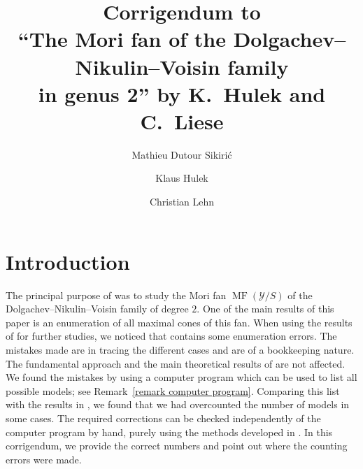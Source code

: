 \documentclass[11pt]{amsart}
\title{Corrigendum to \\
  ``The Mori fan of the Dolgachev--Nikulin--Voisin family\\
  in genus 2'' by K.~Hulek and C.~Liese}
\author{Mathieu Dutour Sikiri\'c}
\author{Klaus Hulek}
\author{Christian Lehn}
\numberwithin{equation}{section}
\theoremstyle{plain}
\theoremstyle{remark}
\newcommand {\Morifan}{\operatorname{MF}}
\newcommand{\sY}{{\mathcal Y}}
\begin{document}


\maketitle


\begin{prelims}

\DisplayAbstractInEnglish

\bigskip

\DisplayKeyWords

\medskip

\DisplayMSCclass


\end{prelims}



\newpage

\setcounter{tocdepth}{1}

\tableofcontents




\section{Introduction}\label{section intro}

The principal purpose of \cite{HL22} was to study the Mori fan $\Morifan(\sY/S)$ of the Dolgachev--Nikulin--Voisin family of degree $2$. One of the main results of this paper is an enumeration of all maximal cones of this fan. When using the results of \cite{HL22} for further studies, we noticed that \cite{HL22} contains some enumeration errors. The mistakes made are in tracing the different cases and are of a bookkeeping nature. The fundamental approach and the main theoretical results of \cite{HL22} are not affected. We found the mistakes by using a computer program which can be used to list all possible models; see Remark~\ref{remark computer program}. Comparing this list with the results in \cite{HL22}, we found that we had overcounted the number of models in some cases.  The required corrections can be checked independently of the computer program by hand, purely using the methods developed in \cite{HL22}. In this corrigendum, we provide the correct numbers and point out where the counting errors were made.
\end{document}
